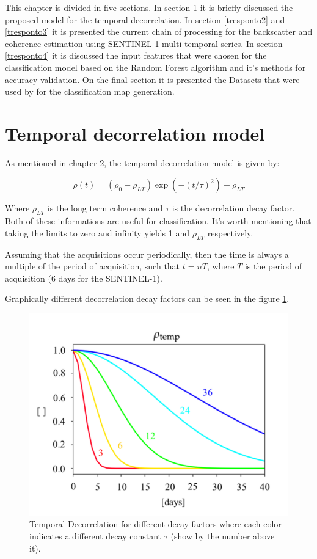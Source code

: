 This chapter is divided in five sections. In section \ref{tresponto1} it is briefly discussed the proposed model for the temporal decorrelation. In section \ref{tresponto2} and \ref{tresponto3} it is presented the current chain of processing for the backscatter and coherence estimation using SENTINEL-1 multi-temporal series. In section \ref{tresponto4} it is discussed the input features that were chosen for the classification model based on the Random Forest algorithm and it's methods for accuracy validation. On the final section it is presented the Datasets that were used by \cite{Paolo} for the classification map generation.

\section{Temporal decorrelation model}
\label{tresponto1}
As mentioned in chapter 2, the temporal decorrelation model is given by:

\begin{equation}
    \rho(t) = (\rho_0 -\rho_{LT}) \exp{\left(-\left(t/{\tau}\right) ^2\right)} + \rho_{LT}
\end{equation}{}

Where $\rho_{LT}$ is the long term coherence and $\tau$ is the decorrelation decay factor. Both of these informations are useful for classification. It's worth mentioning that taking the limits to zero and infinity yields 1 and $\rho_{LT}$ respectively. 

Assuming that the acquisitions occur periodically, then the time is always a multiple of the period of acquisition, such that $t=nT$, where $T$ is the period of acquisition (6 days for the SENTINEL-1). 

Graphically different decorrelation decay factors can be seen in the figure \ref{fig:temporal decorrelation}. 

\begin{figure}[H]
    \centering
    \includegraphics[width=0.7\linewidth]{Cap3/decay.png}
    \caption{Temporal Decorrelation for different decay factors \cite{Paolo} where each color indicates a different decay constant $\tau$ (show by the number above it).}
    \label{fig:temporal decorrelation}
\end{figure}

